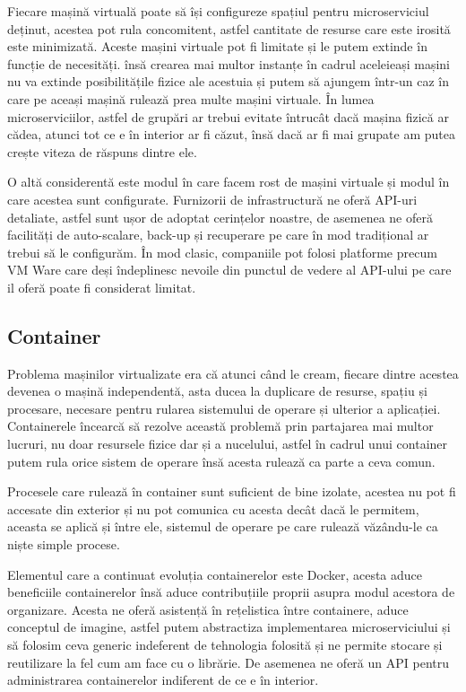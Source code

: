 Fiecare mașină virtuală poate să își configureze spațiul pentru microserviciul deținut,
acestea pot rula concomitent, astfel cantitate de resurse care este irosită este minimizată.
Aceste mașini virtuale pot fi limitate și le putem extinde în funcție de necesități. însă
crearea mai multor instanțe în cadrul aceleieași mașini nu va extinde posibilitățile fizice ale
acestuia și putem să ajungem într-un caz în care pe aceași mașină rulează prea multe mașini virtuale.
În lumea microserviciilor, astfel de grupări ar trebui evitate întrucât dacă mașina fizică
ar cădea, atunci tot ce e în interior ar fi căzut, însă dacă ar fi mai grupate am putea
crește viteza de răspuns dintre ele.

O altă considerentă este modul în care facem rost de mașini virtuale și modul în care acestea
sunt configurate. Furnizorii de infrastructură ne oferă API-uri detaliate, astfel sunt ușor
de adoptat cerințelor noastre, de asemenea ne oferă facilități de auto-scalare, back-up
și recuperare pe care în mod tradițional ar trebui să le configurăm. În mod clasic, companiile
pot folosi platforme precum VM Ware care deși îndeplinesc nevoile din punctul de vedere
al API-ului pe care il oferă poate fi considerat limitat.

\subsection{Container}

Problema mașinilor virtualizate era că atunci când le cream, fiecare dintre
acestea devenea o mașină independentă, asta ducea la duplicare de resurse, spațiu și procesare,
necesare pentru rularea sistemului de operare și ulterior a aplicației. Containerele
încearcă să rezolve această problemă prin partajarea mai multor lucruri, nu doar resursele
fizice dar și a nucelului, astfel în cadrul unui container putem rula orice sistem de operare
însă acesta rulează ca parte a ceva comun.

Procesele care rulează în container sunt suficient de bine izolate, acestea nu pot fi accesate
din exterior și nu pot comunica cu acesta decât dacă le permitem, aceasta se aplică și între ele,
sistemul de operare pe care rulează văzându-le ca niște simple procese.

Elementul care a continuat evoluția containerelor este Docker, acesta aduce beneficiile containerelor
însă aduce contribuțiile proprii asupra modul acestora de organizare. Acesta ne oferă asistență
în rețelistica între containere, aduce conceptul de imagine, astfel putem abstractiza implementarea
microserviciului și să folosim ceva generic indeferent de tehnologia folosită și ne permite
stocare și reutilizare la fel cum am face cu o librărie. De asemenea ne oferă un API pentru
administrarea containerelor indiferent de ce e în interior.

